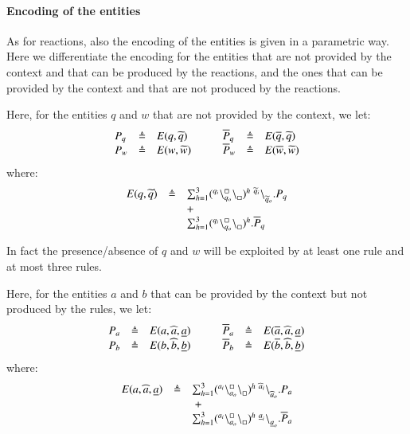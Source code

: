 \paragraph{Encoding of the entities}
As for reactions, also the encoding of the entities is given in a parametric way.
Here we differentiate the encoding for the entities that are not provided by the context and that can be produced by the reactions, and the ones that can be provided by the context and that are not produced by the reactions.

Here, for the entities $q$ and $w$ that are not provided by the context, we let:
\[
\begin{array}{lcl@{\hspace{1cm}}lcl}
P_q & \defeq & E(q,\widetilde{q}) & \overline{P}_q & \defeq & E(\overline{q},\widetilde{q}) \\
P_w& \defeq & E(w,\widetilde{w}) & \overline{P}_w & \defeq & E(\overline{w},\widetilde{w})
\end{array}
\]
where:
\[
\begin{array}{lcl}
E(q,\widetilde{q})&\defeq & \sum_{h=1}^3 (\startchain{q_i}\chainedlink{q_o}{\noact}\chainend{\noact})^h\ \link{\widetilde{q}_i}{\widetilde{q}_o}.P_q\\
&& +\\
&& \sum_{h=1}^3 (\startchain{q_i}\chainedlink{q_o}{\noact}\chainend{\noact})^h.\overline{P}_q\\
\end{array}
\]

In fact the presence/absence of $q$ and $w$ will be exploited by at least one rule and at most three rules.


Here, for the entities $a$ and $b$ that can be provided by the context but not produced by the rules, we let:
\[
\begin{array}{lcl@{\hspace{1cm}}lcl}
P_a & \defeq & E(a,\widehat{a},\underline{a}) & 
\overline{P}_a & \defeq & E(\overline{a},\widehat{a},\underline{a}) \\
P_b& \defeq & E(b,\widehat{b},\underline{b})&
\overline{P}_b& \defeq & E(\overline{b},\widehat{b},\underline{b})
\end{array}
\]
where:
\[
\begin{array}{rcl}
 E(a,\widehat{a},\underline{a}) & \defeq &\sum_{h=1}^3  
  (\startchain{a_i}\chainedlink{a_o}{\noact}\chainend{\noact})^h \ \startchain{\widehat{a}_i}\chainend{\widehat{a}_o}.P_a\\
&&\ + \\
&&
\sum_{h=1}^3
 (\startchain{a_i}\chainedlink{a_o}{\noact}\chainend{\noact})^h \ \startchain{\underline{a}_i}\chainend{\underline{a}_o}.\overline{P}_a
\end{array}
\]


